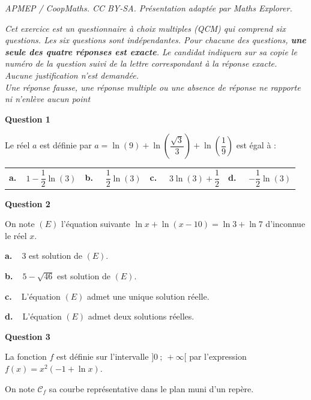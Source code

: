 \documentclass[10pt]{article}
\begin{document}
\noindent\textit{APMEP / CoopMaths. CC BY-SA. Présentation adaptée par Maths Explorer.}\par\medskip
\bigskip

\emph{Cet exercice est un questionnaire à choix multiples (QCM)
 qui comprend six questions. Les six questions sont indépendantes. Pour chacune des questions, \textbf{une seule des quatre réponses est exacte}. Le candidat indiquera sur sa copie le numéro de la question suivi de la lettre correspondant à la réponse exacte.\\
Aucune justification n'est demandée.\\
Une réponse fausse, une réponse multiple ou une absence de réponse ne rapporte ni n'enlève aucun point}

\medskip

\textbf{Question 1}

\medskip

Le réel $a$ est définie par $a = \ln (9) + \ln \left(\dfrac{\sqrt{3}}{3} \right)  + \ln \left(\dfrac19 \right)$ est égal à :

\begin{center}
\begin{tabularx}{\linewidth}{*{4}{X}}
\textbf{a.~~}$1 - \dfrac12 \ln (3)$&\textbf{b.~~} $\dfrac12 \ln (3)$&\textbf{c.~~} $3 \ln (3) + \dfrac12$ &\textbf{d.~~} $- \dfrac12 \ln (3)$
\end{tabularx}
\end{center}
 
\medskip

\textbf{Question 2}

\medskip

On note $(E)$ l'équation suivante $\ln x + \ln (x - 10) = \ln 3 + \ln 7$ d'inconnue le réel $x$.

\medskip
\textbf{a.~~}3 est solution de $(E)$.

\textbf{b.~~}$5 - \sqrt{46}$ est solution de $(E)$.

\textbf{c.~~}L'équation $(E)$ admet une unique solution réelle.

\textbf{d.~~}L'équation $(E)$ admet deux solutions réelles.

\medskip

\textbf{Question 3}

\medskip

La fonction $f$ est définie sur l'intervalle $]0~;~+ \infty[$ par l'expression $f(x) = x^2(- 1 + \ln x)$.

On note $\mathcal{C}_f$ sa courbe représentative dans le plan muni d'un repère.
\end{document}
